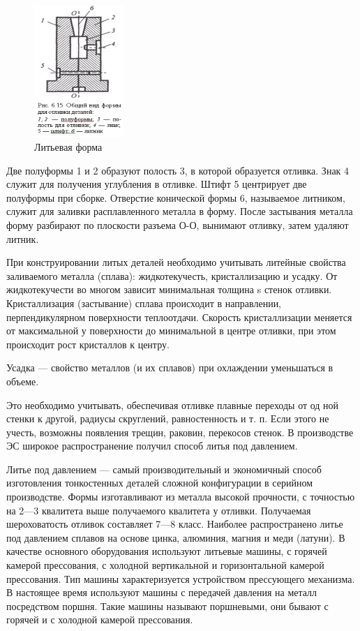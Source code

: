 \documentclass[unicode, 12pt, a4paper, oneside]{article}
\begin{document}
\begin{figure}[htbp]
\centering
\includegraphics[width=0.3\textwidth]{97_form1.png}
\caption{Литьевая форма}
\label{fig:97_form1}
\end{figure}

Две полуформы 1 и 2 образуют полость 3, в которой образуется отливка. Знак 4 служит для получения углубления в отливке. Штифт 5 центрирует две полуформы при сборке. Отверстие конической формы 6, называемое литником, служит для заливки расплавленного металла в форму. После застывания металла форму разбирают по плоскости разъема О-О, вынимают отливку, затем удаляют литник.

При конструировании литых деталей необходимо учитывать литейные свойства заливаемого металла (сплава): жидкотекучесть, кристаллизацию и усадку. От жидкотекучести во многом зависит минимальная толщина s стенок отливки. Кристаллизация (застывание) сплава происходит в направлении, перпендикулярном поверхности теплоотдачи. Скорость кристаллизации меняется от максимальной у поверхности до минимальной в центре отливки, при этом происходит рост кристаллов к центру.

Усадка — свойство металлов (и их сплавов) при охлаждении уменьшаться в объеме.

Это необходимо учитывать, обеспечивая отливке плавные переходы от од ной стенки к другой, радиусы скруглений, равностенность и т. п. Если этого не учесть, возможны появления трещин, раковин, перекосов стенок. В производстве ЭС широкое распространение получил способ литья под давлением.

Литье под давлением — самый производительный и экономичный способ изготовления тонкостенных деталей сложной конфигурации в серийном производстве. Формы изготавливают из металла высокой прочности, с точностью на 2—3 квалитета выше получаемого квалитета у отливки. Получаемая шероховатость отливок составляет 7—8 класс. Наиболее распространено литье под давлением сплавов на основе цинка, алюминия, магния и меди (латуни). В качестве основного оборудования используют литьевые машины, с горячей камерой прессования, с холодной вертикальной и горизонтальной камерой прессования. Тип машины характеризуется устройством прессующего механизма. В настоящее время используют машины с передачей давления на металл посредством поршня. Такие машины называют поршневыми, они бывают с горячей и с холодной камерой прессования.
\end{document}
